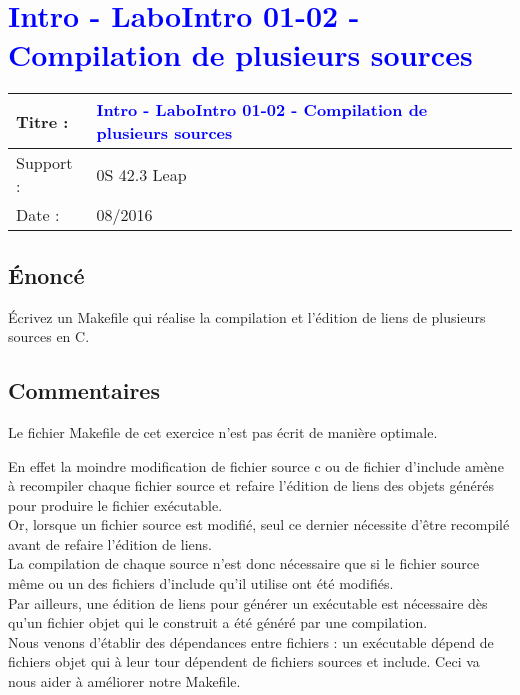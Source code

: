 \lstset{language=c}
\renewcommand{\titre}{\textcolor{blue}{ Intro - LaboIntro 01-02 - Compilation de plusieurs sources }}

\lhead{ \titre }
\section{{\titre} }

\begin{tabular}{|l|l|}
\hline
Titre : 	& \titre \\\hline
Support : 	& 0S 42.3 Leap \\\hline
Date :		& 08/2016\\\hline
\end{tabular}

\subsection{Énoncé}
Écrivez un Makefile qui réalise la compilation et l'édition de liens de plusieurs sources en C.











\subsection{Commentaires}

Le fichier Makefile de cet exercice n'est pas écrit de manière optimale.

En effet la moindre modification de fichier source c ou de fichier d'include amène à recompiler chaque fichier source et refaire l'édition de liens des objets générés pour produire le fichier exécutable. 
\\Or, lorsque un fichier source est modifié, seul ce dernier nécessite d'être recompilé avant de refaire l'édition de liens. \\
La compilation de chaque source n'est donc nécessaire que si le fichier source même ou un des fichiers d'include qu'il utilise ont été modifiés. \\
Par ailleurs, une édition de liens pour générer un exécutable est nécessaire dès qu'un fichier objet qui le construit a été généré par une compilation.\\ Nous venons d'établir des dépendances entre fichiers : un exécutable dépend de fichiers objet qui à leur tour dépendent de fichiers sources et include. Ceci va nous aider à améliorer notre Makefile. 

